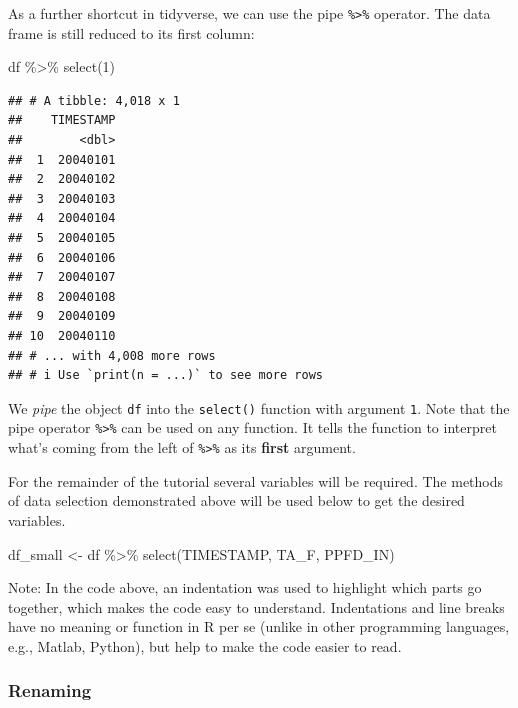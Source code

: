 \documentclass[
]{book}
\newenvironment{Shaded}{\begin{snugshade}}{\end{snugshade}}
\newcommand{\DecValTok}[1]{\textcolor[rgb]{0.00,0.00,0.81}{#1}}
\newcommand{\FunctionTok}[1]{\textcolor[rgb]{0.00,0.00,0.00}{#1}}
\newcommand{\NormalTok}[1]{#1}
\newcommand{\OtherTok}[1]{\textcolor[rgb]{0.56,0.35,0.01}{#1}}
\newcommand{\SpecialCharTok}[1]{\textcolor[rgb]{0.00,0.00,0.00}{#1}}
\begin{document}
As a further shortcut in tidyverse, we can use the pipe \texttt{\%\textgreater{}\%} operator. The data frame is still reduced to its first column:

\begin{Shaded}
\begin{Highlighting}[]
\NormalTok{df }\SpecialCharTok{\%\textgreater{}\%} \FunctionTok{select}\NormalTok{(}\DecValTok{1}\NormalTok{)}
\end{Highlighting}
\end{Shaded}

\begin{verbatim}
## # A tibble: 4,018 x 1
##    TIMESTAMP
##        <dbl>
##  1  20040101
##  2  20040102
##  3  20040103
##  4  20040104
##  5  20040105
##  6  20040106
##  7  20040107
##  8  20040108
##  9  20040109
## 10  20040110
## # ... with 4,008 more rows
## # i Use `print(n = ...)` to see more rows
\end{verbatim}

We \emph{pipe} the object \texttt{df} into the \texttt{select()} function with argument \texttt{1}. Note that the pipe operator \texttt{\%\textgreater{}\%} can be used on any function. It tells the function to interpret what's coming from the left of \texttt{\%\textgreater{}\%} as its \textbf{first} argument.

For the remainder of the tutorial several variables will be required. The methods of data selection demonstrated above will be used below to get the desired variables.

\begin{Shaded}
\begin{Highlighting}[]
\NormalTok{df\_small }\OtherTok{\textless{}{-}}\NormalTok{ df }\SpecialCharTok{\%\textgreater{}\%} 
  \FunctionTok{select}\NormalTok{(TIMESTAMP, TA\_F, PPFD\_IN)}
\end{Highlighting}
\end{Shaded}

Note: In the code above, an indentation was used to highlight which parts go together, which makes the code easy to understand. Indentations and line breaks have no meaning or function in R per se (unlike in other programming languages, e.g., Matlab, Python), but help to make the code easier to read.

\hypertarget{renaming}{%
\subsubsection{Renaming}\label{renaming}}
\end{document}
